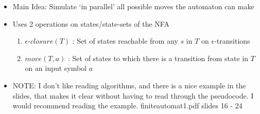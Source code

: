 \documentclass[11pt]{article}
\newenvironment{itemise}{
\begin{itemize}
  \setlength{\itemsep}{1pt}
  \setlength{\parskip}{0pt}
  \setlength{\parsep}{0pt}
}{\end{itemize}}
\begin{document}
\begin{itemise}
 \item Main Idea: Simulate `in parallel' all possible moves the automaton can make
 \item Uses 2 operations on states/state-sets of the NFA
 \begin{enumerate}
  \item $\epsilon$-$closure(T)$ : Set of states reachable from any $s$ in $T$ on $\epsilon$-transitions
  \item $move(T, a)$ : Set of states to which there is a transition from state in $T$ on an input symbol $a$
 \end{enumerate}
 \item NOTE: I don't like reading algorithms, and there is a nice example in the slides, that makes it clear without having to read through the pseudocode. I would recommend reading the example. finiteautomat1.pdf slides 16 - 24
\end{itemise}
\end{document}

